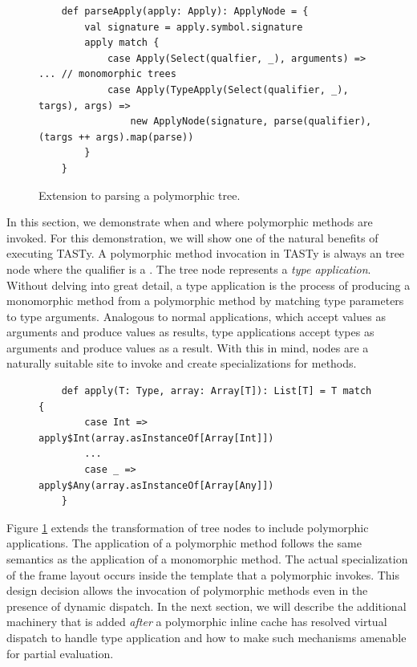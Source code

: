 \begin{figure}[!htb]
	\begin{verbatim}
	def parseApply(apply: Apply): ApplyNode = {
		val signature = apply.symbol.signature
		apply match {
			case Apply(Select(qualfier, _), arguments) => ... // monomorphic trees
			case Apply(TypeApply(Select(qualifier, _), targs), args) =>
				new ApplyNode(signature, parse(qualifier), (targs ++ args).map(parse))
		}
	}
	\end{verbatim}
	\caption{Extension to parsing a polymorphic  tree.}
	\label{impl:parse-typeapply}
\end{figure}

In this section, we demonstrate when and where polymorphic methods are invoked.
For this demonstration, we will show one of the natural benefits of executing TASTy.
A polymorphic method invocation in TASTy is always an  tree node where the qualifier is a .
The  tree node represents a \textit{type application}.
Without delving into great detail, a type application is the process of producing a monomorphic method from a polymorphic method by matching type parameters to type arguments.
Analogous to normal applications, which accept values as arguments and produce values as results, type applications accept types as arguments and produce values as a result.
With this in mind,  nodes are a naturally suitable site to invoke and create specializations for methods.

\begin{figure}[!htb]
	\begin{verbatim}
	def apply(T: Type, array: Array[T]): List[T] = T match {
		case Int => apply$Int(array.asInstanceOf[Array[Int]])
		...
		case _ =>   apply$Any(array.asInstanceOf[Array[Any]])
	}
	\end{verbatim}
\end{figure}

Figure \ref{impl:parse-typeapply} extends the transformation of  tree nodes to include polymorphic applications.
The application of a polymorphic method follows the same semantics as the application of a monomorphic method.
The actual specialization of the frame layout occurs inside the template that a polymorphic  invokes.
This design decision allows the invocation of polymorphic methods even in the presence of dynamic dispatch.
In the next section, we will describe the additional machinery that is added \textit{after} a polymorphic inline cache has resolved virtual dispatch to handle type application and how to make such mechanisms amenable for partial evaluation.


